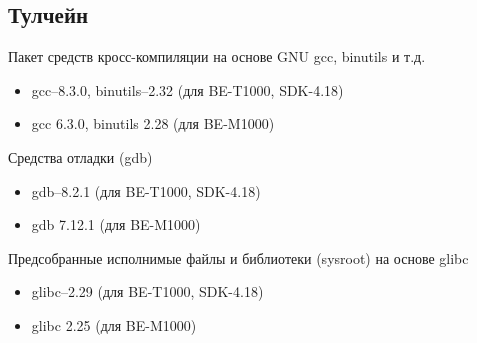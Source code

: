 \documentclass[10pt, a5paper]{article}
\begin{document}
\subsection*{Тулчейн}

Пакет средств кросс-компиляции на основе GNU gcc, binutils и т.д.
\begin{itemize}
\item gcc–8.3.0, binutils–2.32 (для BE-T1000, SDK-4.18)
\item gcc 6.3.0, binutils 2.28 (для BE-M1000)
\end{itemize}
Средства отладки (gdb)
\begin{itemize}
\item gdb–8.2.1 (для BE-T1000, SDK-4.18)
\item gdb 7.12.1 (для BE-M1000)
\end{itemize}
Предсобранные исполнимые файлы и библиотеки (sysroot) на основе glibc
\begin{itemize}
\item glibc–2.29 (для BE-T1000, SDK-4.18)
\item glibc 2.25 (для BE-M1000)
\end{itemize}
\end{document}
